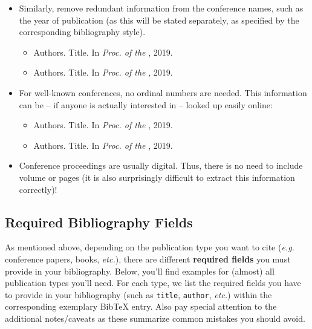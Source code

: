 \documentclass[11pt,a4paper]{article}
\begin{document}
\begin{itemize}
\item Similarly, remove redundant information from the conference names, such as the year of publication (as this will be stated separately, as specified by the corresponding bibliography style).
%
\vspace{-0.25cm}
%
\begin{itemize}
\item Authors. Title. In \emph{Proc. of the }, 2019.
\item Authors. Title. In \emph{Proc. of the }, 2019.
\end{itemize}

\item For well-known conferences, no ordinal numbers are needed. This information can be
-- if anyone is actually interested in -- looked up easily online:
%
\vspace{-0.25cm}
%
\begin{itemize}
\item Authors. Title. In \emph{Proc. of the }, 2019.
\item Authors. Title. In \emph{Proc. of the }, 2019.
\end{itemize}

\item Conference proceedings are usually digital. Thus, there is no need to include volume or pages (it is also surprisingly difficult to extract this information correctly)!

\end{itemize}


\subsection{Required Bibliography Fields}
\label{sec-bibtex-entries}

As mentioned above, depending on the publication type you want to cite (\emph{e.g.} conference papers, books, \emph{etc.}), there are different \textbf{required fields} you must provide in your bibliography. Below, you'll find examples for (almost) all publication types you'll need.
For each type, we list the required fields you have to provide in your bibliography (such as \texttt{title}, \texttt{author}, \emph{etc.}) within the corresponding exemplary BibTeX entry.
Also pay special attention to the additional notes/caveats as these summarize common mistakes you should avoid.
\end{document}
